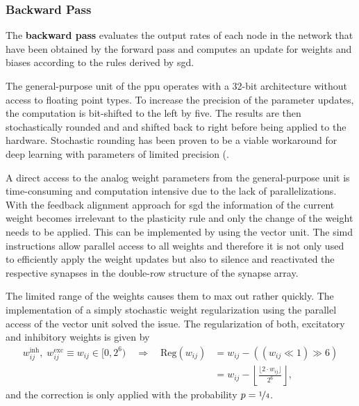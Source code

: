 \subsubsection*{Backward Pass}
The \textbf{backward pass} evaluates the output rates of each node in the network that have been obtained by the forward pass and computes an update for weights and biases according to the rules derived by \acrshort{sgd}.

The general-purpose unit of the \gls{ppu} operates with a 32-bit architecture without access to floating point types. To increase the precision of the parameter updates, the computation is bit-shifted to the left by five. The results are then stochastically rounded and and shifted back to right before being applied to the hardware. Stochastic rounding has been proven to be a viable workaround for deep learning with parameters of limited precision (\citealp{limitedprecisionpaper}.

A direct access to the analog weight parameters from the general-purpose unit is time-consuming and computation intensive due to the lack of parallelizations. With the feedback alignment approach for \acrshort{sgd} the information of the current weight becomes irrelevant to the plasticity rule and only the change of the weight needs to be applied. This can be implemented by using the vector unit. The \gls{simd} instructions allow parallel access to all weights and therefore it is not only used to efficiently apply the weight updates but also to silence and reactivated the respective synapses in the double-row structure of the synapse array. 

The limited range of the weights causes them to max out rather quickly. The implementation of a simply stochastic weight regularization using the parallel access of the vector unit solved the issue. The regularization of both, excitatory and inhibitory weights is given by
\begin{align}
w_{ij}^\text{inh},\; w_{ij}^\text{exc}\equiv w_{ij} \in [0,2^6) \quad  \Rightarrow \quad \text{Reg}(w_{ij}) &= w_{ij} - \left(\left(w_{ij} \ll 1\right) \gg 6\right) \nonumber \\
&= w_{ij} - \left\lfloor \frac{\lfloor 2 \cdot w_{ij}  \rfloor}{2^{6}} \right\rfloor,								
\end{align}
and the correction is only applied with the probability $p=\nicefrac{1}{4}$.

